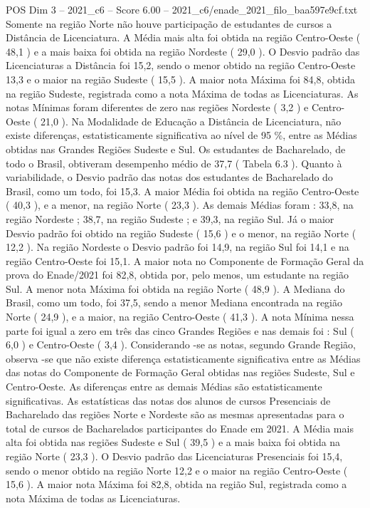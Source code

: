 \begin{textsample}{POS Dim 3 – 2021\_c6 – Score 6.00 – 2021\_c6/enade\_2021\_filo\_baa597e9cf.txt}
Somente na região Norte não houve participação de estudantes de cursos a Distância de Licenciatura.
A Média mais alta foi obtida na região Centro-Oeste ( 48,1 ) e a mais baixa foi obtida na região Nordeste ( 29,0 ).
O Desvio padrão das Licenciaturas a Distância foi 15,2, sendo o menor obtido na região Centro-Oeste 13,3 e o maior na região Sudeste ( 15,5 ).
A maior nota Máxima foi 84,8, obtida na região Sudeste, registrada como a nota Máxima de todas as Licenciaturas.
As notas Mínimas foram diferentes de zero nas regiões Nordeste ( 3,2 ) e Centro-Oeste ( 21,0 ).
Na Modalidade de Educação a Distância de Licenciatura, não existe diferenças, estatisticamente significativa ao nível de 95 \%, entre as Médias obtidas nas Grandes Regiões Sudeste e Sul.
Os estudantes de Bacharelado, de todo o Brasil, obtiveram desempenho médio de 37,7 ( Tabela 6.3 ).
Quanto à variabilidade, o Desvio padrão das notas dos estudantes de Bacharelado do Brasil, como um todo, foi 15,3.
A maior Média foi obtida na região Centro-Oeste ( 40,3 ), e a menor, na região Norte ( 23,3 ).
As demais Médias foram : 33,8, na região Nordeste ; 38,7, na região Sudeste ; e 39,3, na região Sul.
Já o maior Desvio padrão foi obtido na região Sudeste ( 15,6 ) e o menor, na região Norte ( 12,2 ).
Na região Nordeste o Desvio padrão foi 14,9, na região Sul foi 14,1 e na região Centro-Oeste foi 15,1.
A maior nota no Componente de Formação Geral da prova do Enade/2021 foi 82,8, obtida por, pelo menos, um estudante na região Sul.
A menor nota Máxima foi obtida na região Norte ( 48,9 ).
A Mediana do Brasil, como um todo, foi 37,5, sendo a menor Mediana encontrada na região Norte ( 24,9 ), e a maior, na região Centro-Oeste ( 41,3 ).
A nota Mínima nessa parte foi igual a zero em três das cinco Grandes Regiões e nas demais foi : Sul ( 6,0 ) e Centro-Oeste ( 3,4 ).
Considerando -se as notas, segundo Grande Região, observa -se que não existe diferença estatisticamente significativa entre as Médias das notas do Componente de Formação Geral obtidas nas regiões Sudeste, Sul e Centro-Oeste.
As diferenças entre as demais Médias são estatisticamente significativas.
As estatísticas das notas dos alunos de cursos Presenciais de Bacharelado das regiões Norte e Nordeste são as mesmas apresentadas para o total de cursos de Bacharelados participantes do Enade em 2021.
A Média mais alta foi obtida nas regiões Sudeste e Sul ( 39,5 ) e a mais baixa foi obtida na região Norte ( 23,3 ).
O Desvio padrão das Licenciaturas Presenciais foi 15,4, sendo o menor obtido na região Norte 12,2 e o maior na região Centro-Oeste ( 15,6 ).
A maior nota Máxima foi 82,8, obtida na região Sul, registrada como a nota Máxima de todas as Licenciaturas.

\end{textsample}
